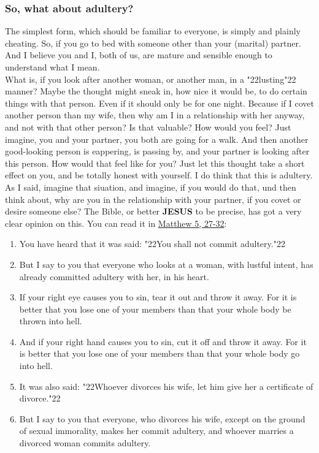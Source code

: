 \documentclass[12pt,a5paper]{article}
\newcommand{\Jesus}[0]{\textbf{JESUS}}
\newcommand{\q}[1]{\char"22{#1}\char"22 }
\begin{document}
	\subsubsection{So, what about adultery?}
		The simplest form,
		which should be familiar to everyone,
		is simply and plainly cheating.
		So,
		if you go to bed with someone other than your (marital) partner.
		And I believe you and I,
		both of us,
		are mature and sensible enough to understand what I mean.
		\\
		What is,
		if you look after another woman,
		or another man,
		in a \q{lusting} manner?
		Maybe the thought might sneak in,
		how nice it would be,
		to do certain things with that person.
		Even if it should only be for one night.
		Because if I covet another person than my wife,
		then why am I in a relationship with her anyway,
		and not with that other person?
		Is that valuable?
		How would you feel?
		Just imagine,
		you and your partner,
		you both are going for a walk.
		And then another good-looking person is eappering,
		is passing by,
		and your partner is looking after this person.
		How would that feel like for you?
		Just let this thought take a short effect on you,
		and be totally honest with yourself.
		I do think that this is adultery.
		As I said,
		imagine that siuation,
		and imagine,
		if you would do that,
		und then think about,
		why are you in the relationship with your partner,
		if you covet or desire someone else?
		The Bible,
		or better {\Jesus} to be precise,
		has got a very clear opinion on this.
		You can read it in \href{https://www.die-bibel.de/bibeln/online-bibeln/lesen/ESV/MAT.5/Matthew-5}{Matthew 5, 27-32}:
		\begin{enumerate}[noitemsep,start=27]
			\item	You have heard that it was said:
					\q{You shall not commit adultery.}
			\item	But I say to you that everyone who looks at a woman,
					with lustful intent,
					has already committed adultery with her,
					in his heart.
			\item	If your right eye causes you to sin,
					tear it out and throw it away.
					For it is better that you lose one of your members than that your whole body be thrown into hell.
			\item	And if your right hand causes you to sin,
					cut it off and throw it away.
					For it is better that you lose one of your members than that your whole body go into hell.
			\item	It was also said:
					\q{Whoever divorces his wife,
					let him give her a certificate of divorce.}
			\item	But I say to you that everyone,
					who divorces his wife,
					except on the ground of sexual immorality,
					makes her commit adultery,
					and whoever marries a divorced woman commits adultery.
		\end{enumerate}
		
\end{document}
